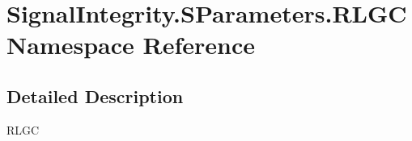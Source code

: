 \hypertarget{namespaceSignalIntegrity_1_1SParameters_1_1RLGC}{}\section{Signal\+Integrity.\+S\+Parameters.\+R\+L\+GC Namespace Reference}
\label{namespaceSignalIntegrity_1_1SParameters_1_1RLGC}


\subsection{Detailed Description}
\begin{DoxyVerb}RLGC\end{DoxyVerb}
 